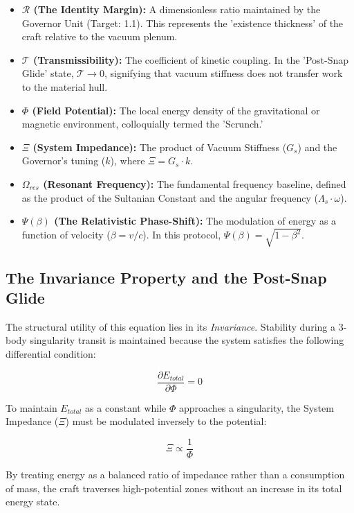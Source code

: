 \documentclass[11pt]{article}
\begin{document}
\begin{itemize}
    \item \textbf{$\mathcal{R}$ (The Identity Margin):} A dimensionless ratio maintained by the Governor Unit (Target: 1.1). This represents the 'existence thickness' of the craft relative to the vacuum plenum.
    \item \textbf{$\mathcal{T}$ (Transmissibility):} The coefficient of kinetic coupling. In the 'Post-Snap Glide' state, $\mathcal{T} \to 0$, signifying that vacuum stiffness does not transfer work to the material hull.
    \item \textbf{$\Phi$ (Field Potential):} The local energy density of the gravitational or magnetic environment, colloquially termed the 'Scrunch.'
    \item \textbf{$\Xi$ (System Impedance):} The product of Vacuum Stiffness ($G_s$) and the Governor's tuning ($k$), where $\Xi = G_s \cdot k$.
    \item \textbf{$\Omega_{res}$ (Resonant Frequency):} The fundamental frequency baseline, defined as the product of the Sultanian Constant and the angular frequency ($\Lambda_s \cdot \omega$).
    \item \textbf{$\Psi(\beta)$ (The Relativistic Phase-Shift):} The modulation of energy as a function of velocity ($\beta = v/c$). In this protocol, $\Psi(\beta) = \sqrt{1 - \beta^2}$.
\end{itemize}

\subsection{The Invariance Property and the Post-Snap Glide}
The structural utility of this equation lies in its \textit{Invariance}. Stability during a 3-body singularity transit is maintained because the system satisfies the following differential condition:

\begin{equation}
    \frac{\partial E_{total}}{\partial \Phi} = 0
\end{equation}

To maintain $E_{total}$ as a constant while $\Phi$ approaches a singularity, the System Impedance ($\Xi$) must be modulated inversely to the potential:

\begin{equation}
    \Xi \propto \frac{1}{\Phi}
\end{equation}

By treating energy as a balanced ratio of impedance rather than a consumption of mass, the craft traverses high-potential zones without an increase in its total energy state.
\end{document}
